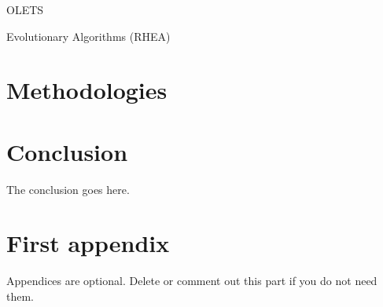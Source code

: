 \documentclass[journal]{IEEEtran}
\begin{document}
		
		OLETS
		
		
		Evolutionary Algorithms
		(RHEA)
		
		
	
\section{Methodologies}	
		
		


\section{Conclusion}
The conclusion goes here.






\appendices
\section{First appendix}
Appendices are optional. Delete or comment out this part if you do not need them.

\end{document}
